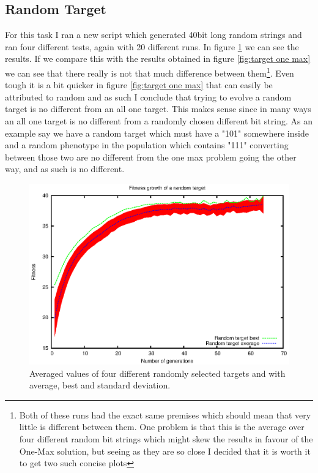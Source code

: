 \subsection{Random Target}\label{sec:random target}
For this task I ran a new script which generated 40bit long random strings and
ran four different tests, again with 20 different runs. In figure
\ref{fig:random target} we can see the results. If we compare this with the
results obtained in figure \ref{fig:target one max} we can see that there really is
not that much difference between them\footnote{Both of these runs had the exact
	same premises which should mean that very little is different between
	them. One problem is that this is the average over four different random
	bit strings which might skew the results in favour of the One-Max
	solution, but seeing as they are so close I decided that it is worth it
to get two such concise plots}. Even tough it is a bit quicker in figure
\ref{fig:target one max} that can easily be attributed to random and as such I
conclude that trying to evolve a random target is no different from an all one
target. This makes sense since in many ways an all one target is no different
from a randomly chosen different bit string. As an example say we have a random
target which must have a "101" somewhere inside and a random phenotype in the
population which contains "111" converting between those two are no different from the
one max problem going the other way, and as such is no different.

\begin{figure}[h!]
	\includegraphics{../graphs/fitness_target_random.eps}
	\caption{Averaged values of four different randomly selected targets and
	with average, best and standard deviation.}
	\label{fig:random target}
\end{figure}

